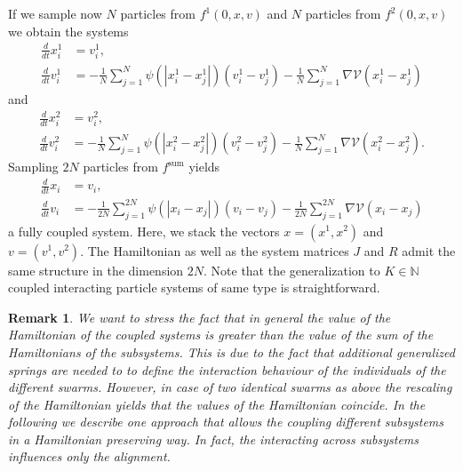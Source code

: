 \documentclass[11pt]{article}
\newtheorem*{remark}{Remark}
\newcommand{\N}[0]{\mathbb N}
\newcommand{\calV}[0]{\mathcal V}
\begin{document}
\begin{bibunit}[abbrv]
If we sample now $N$ particles from $f^1(0,x,v)$ and $N$ particles from $f^2(0,x,v)$ we obtain the systems
\begin{align*}
    \frac{d}{dt} x_i^1 &= v_i^1, \\
    \frac{d}{dt} v_i^1 &= -\frac{1}{N} \sum_{j=1}^{N} \psi(| x_i^1 - x_j^1  |)(v_i^1 - v_j^1) - \frac{1}{N} \sum_{j=1}^{N} \nabla \calV(x_i^1 - x_j^1)
\end{align*}
and
\begin{align*}
    \frac{d}{dt} x_i^2 &= v_i^2, \\
    \frac{d}{dt} v_i^2 &= -\frac{1}{N} \sum_{j=1}^{N} \psi(| x_i^2 - x_j^2  |)(v_i^2 - v_j^2) - \frac{1}{N} \sum_{j=1}^{N} \nabla \calV(x_i^2 - x_j^2).
\end{align*}
Sampling $2N$ particles from $f^\mathrm{sum}$ yields
\begin{align*}
    \frac{d}{dt} x_i &= v_i, \\
    \frac{d}{dt} v_i &= -\frac{1}{2N} \sum_{j=1}^{2N} \psi(| x_i - x_j  |)(v_i - v_j) - \frac{1}{2N} \sum_{j=1}^{2N} \nabla \calV(x_i - x_j)
\end{align*}
a fully coupled system. Here, we stack the vectors $x=(x^1,x^2)$ and $v=(v^1,v^2)$. The Hamiltonian as well as the system matrices $J$ and $R$ admit the same structure in the dimension $2N$. Note that the generalization to $K\in\N$ coupled interacting particle systems of same type is straightforward.

\begin{remark}\label{rem:Hpreserving}
We want to stress the fact that in general the value of the Hamiltonian of the coupled systems is greater than the value of the sum of the Hamiltonians of the subsystems. This is due to the fact that additional generalized springs are needed to to define the interaction behaviour of the individuals of the different swarms. However, in case of two identical swarms as above the rescaling of the Hamiltonian yields that the values of the Hamiltonian coincide. In the following we describe one approach that allows the coupling different subsystems in a Hamiltonian preserving way. In fact, the interacting across subsystems influences only the alignment.
\end{remark}



\end{bibunit}
\end{document}
